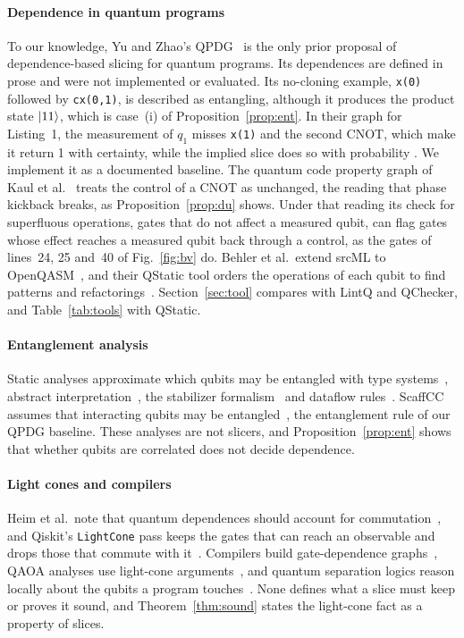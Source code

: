 \paragraph*{Dependence in quantum programs}
To our knowledge, Yu and Zhao's QPDG~\cite{yu2025qpdg} is the only prior proposal of dependence-based
slicing for quantum programs. Its dependences are defined in prose and were not implemented or evaluated. Its no-cloning example, \texttt{x(0)} followed by \texttt{cx(0,1)}, is described as entangling,
although it produces the product state $\lvert 11\rangle$, which is case~(i) of Proposition~\ref{prop:ent}. In their
graph for Listing~1, the measurement of $q_1$ misses \texttt{x(1)} and the second CNOT, which make it
return 1 with certainty, while the implied slice does so with probability \numYzFigSliceProb{}. We implement it as a documented baseline. The quantum code property graph of Kaul et al.~\cite{kaul2023uniform} treats the control of a CNOT as
unchanged, the reading that phase kickback breaks, as Proposition~\ref{prop:du} shows. Under that reading its
check for superfluous operations, gates that do not affect a measured qubit, can flag gates whose effect
reaches a measured qubit back through a control, as the gates of lines~24, 25 and~40 of Fig.~\ref{fig:bv} do. Behler et al.\ extend srcML to OpenQASM~\cite{behler2024supporting}, and their
QStatic tool orders the operations of each qubit to find patterns and refactorings~\cite{behler2025static}.
Section~\ref{sec:tool} compares \tool{} with LintQ and QChecker, and Table~\ref{tab:tools} with QStatic.

\paragraph*{Entanglement analysis}
Static analyses approximate which qubits may be entangled with type
systems~\cite{perdrix2007types, prost2009reasoning, yuan2022twist}, abstract
interpretation~\cite{perdrix2008entanglement, yu2021abstract}, the stabilizer
formalism~\cite{honda2015stabilizer} and dataflow rules~\cite{xia2025entanglement}. ScaffCC assumes that
interacting qubits may be entangled~\cite{javadiabhari2015scaffcc, zhao2023qchecker}, the entanglement
rule of our QPDG baseline. These analyses are not slicers, and Proposition~\ref{prop:ent} shows that
whether qubits are correlated does not decide dependence.

\paragraph*{Light cones and compilers}
Heim et al.\ note that quantum dependences should account for commutation~\cite{heim2020quantum}, and Qiskit's \texttt{LightCone} pass keeps the gates that can reach an
observable and drops those that commute with it~\cite{qiskit2025}. Compilers build gate-dependence graphs~\cite{murali2019triq, amy2020staq}, QAOA analyses use light-cone
arguments~\cite{farhi2014qaoa}, and quantum separation logics reason locally about the qubits a program
touches~\cite{zhou2021qsl, le2022qsl}. None defines what a slice must keep or proves it
sound, and Theorem~\ref{thm:sound} states the light-cone fact as a property of slices.

